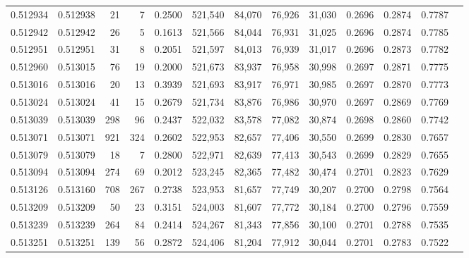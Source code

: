 \begin{tabular}{rrrrrrrrrrrrr}
0.512934 & 0.512938 &    21 &     7 &                                     0.2500 & 521,540 &  84,070 &  76,926 &  31,030 & 0.2696 & 0.2874 & 0.7787 \\
0.512942 & 0.512942 &    26 &     5 &                                     0.1613 & 521,566 &  84,044 &  76,931 &  31,025 & 0.2696 & 0.2874 & 0.7785 \\
0.512951 & 0.512951 &    31 &     8 &                                     0.2051 & 521,597 &  84,013 &  76,939 &  31,017 & 0.2696 & 0.2873 & 0.7782 \\
0.512960 & 0.513015 &    76 &    19 &                                     0.2000 & 521,673 &  83,937 &  76,958 &  30,998 & 0.2697 & 0.2871 & 0.7775 \\
0.513016 & 0.513016 &    20 &    13 &                                     0.3939 & 521,693 &  83,917 &  76,971 &  30,985 & 0.2697 & 0.2870 & 0.7773 \\
0.513024 & 0.513024 &    41 &    15 &                                     0.2679 & 521,734 &  83,876 &  76,986 &  30,970 & 0.2697 & 0.2869 & 0.7769 \\
0.513039 & 0.513039 &   298 &    96 &                                     0.2437 & 522,032 &  83,578 &  77,082 &  30,874 & 0.2698 & 0.2860 & 0.7742 \\
0.513071 & 0.513071 &   921 &   324 &                                     0.2602 & 522,953 &  82,657 &  77,406 &  30,550 & 0.2699 & 0.2830 & 0.7657 \\
0.513079 & 0.513079 &    18 &     7 &                                     0.2800 & 522,971 &  82,639 &  77,413 &  30,543 & 0.2699 & 0.2829 & 0.7655 \\
0.513094 & 0.513094 &   274 &    69 &                                     0.2012 & 523,245 &  82,365 &  77,482 &  30,474 & 0.2701 & 0.2823 & 0.7629 \\
0.513126 & 0.513160 &   708 &   267 &                                     0.2738 & 523,953 &  81,657 &  77,749 &  30,207 & 0.2700 & 0.2798 & 0.7564 \\
0.513209 & 0.513209 &    50 &    23 &                                     0.3151 & 524,003 &  81,607 &  77,772 &  30,184 & 0.2700 & 0.2796 & 0.7559 \\
0.513239 & 0.513239 &   264 &    84 &                                     0.2414 & 524,267 &  81,343 &  77,856 &  30,100 & 0.2701 & 0.2788 & 0.7535 \\
0.513251 & 0.513251 &   139 &    56 &                                     0.2872 & 524,406 &  81,204 &  77,912 &  30,044 & 0.2701 & 0.2783 & 0.7522 \\

\end{tabular}
